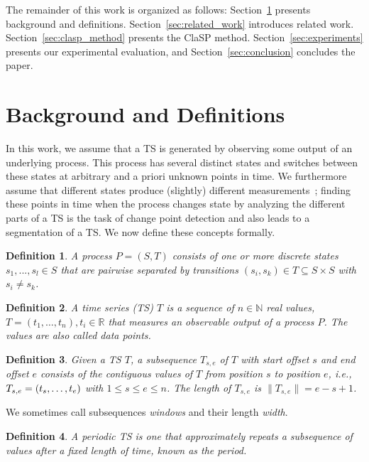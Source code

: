 \documentclass[pdflatex,sn-basic]{sn-jnl}
\newtheorem{definition}{Definition}
\begin{document}
The remainder of this work is organized as follows: Section~\ref{sec:background} presents background and definitions. Section~\ref{sec:related_work} introduces related work. Section~\ref{sec:clasp_method} presents the ClaSP method. Section~\ref{sec:experiments} presents our experimental evaluation, and Section~\ref{sec:conclusion} concludes the paper.


\section{Background and Definitions}\label{sec:background}

In this work, we assume that a TS is generated by observing some output of an underlying process. This process has several distinct states and switches between these states at arbitrary and a priori unknown points in time. We furthermore assume that different states produce (slightly) different measurements~\citep{Gharghabi2018DomainAO}; finding these points in time when the process changes state by analyzing the different parts of a TS is the task of change point detection and also leads to a segmentation of a TS. We now define these concepts formally.

\begin{definition}
A process $P = (S,T)$ consists of one or more discrete states $s_1, ..., s_l \in S$ that are pairwise separated by transitions $(s_i,s_k) \in T \subseteq  S \times S$ with $s_i \neq s_k$.
\end{definition}

\begin{definition}
A \emph{time series (TS)} $T$ is a sequence of $n \in \mathbb{N}$ real values, $T=(t_{1},\ldots,t_{n}),t_{i} \in \mathbb{R}$ that measures an observable output of a process $P$. The values are also called data points.
\end{definition}

\begin{definition}
Given a TS $T$, a \emph{subsequence} $T_{s,e}$ of $T$ with start offset $s$ and end offset $e$ consists of the contiguous values of $T$ from position $s$ to position $e$, i.e., $T_{s,e}=(t_{s},\text{\dots},t_{e})$ with $1\leq s \leq e \leq n$. The length of $T_{s,e}$ is $\|T_{s,e}\| = e-s+1$.
\end{definition}

We sometimes call subsequences \emph{windows} and their length \emph{width}.

\begin{definition}
A \emph{periodic} TS is one that approximately repeats a subsequence of values after a fixed length of time, known as the period.
\end{definition}
\end{document}
